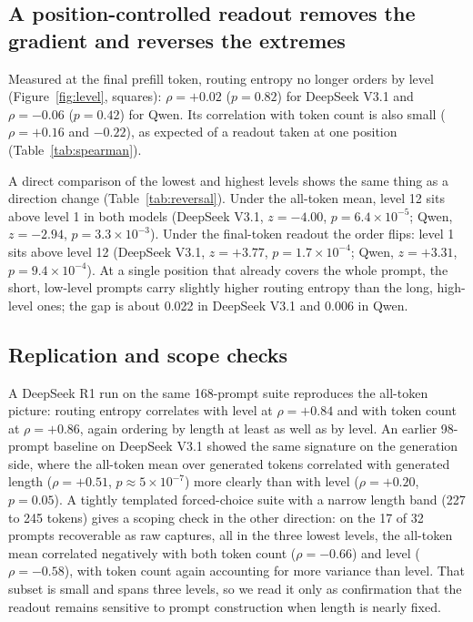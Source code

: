 \documentclass[10pt,twocolumn]{article}
\begin{document}
\subsection{A position-controlled readout removes the gradient and reverses the extremes}

Measured at the final prefill token, routing entropy no longer orders by
level (Figure~\ref{fig:level}, squares): $\rho=+0.02$ ($p=0.82$) for
DeepSeek V3.1 and $\rho=-0.06$ ($p=0.42$) for Qwen. Its correlation with
token count is also small ($\rho=+0.16$ and $-0.22$), as expected of a
readout taken at one position (Table~\ref{tab:spearman}).

A direct comparison of the lowest and highest levels shows the same thing as
a direction change (Table~\ref{tab:reversal}). Under the all-token mean,
level 12 sits above level 1 in both models (DeepSeek V3.1, $z=-4.00$,
$p=6.4\times10^{-5}$; Qwen, $z=-2.94$, $p=3.3\times10^{-3}$). Under the
final-token readout the order flips: level 1 sits above level 12
(DeepSeek V3.1, $z=+3.77$, $p=1.7\times10^{-4}$; Qwen, $z=+3.31$,
$p=9.4\times10^{-4}$). At a single position that already covers the whole
prompt, the short, low-level prompts carry slightly higher routing entropy
than the long, high-level ones; the gap is about 0.022 in DeepSeek V3.1 and
0.006 in Qwen.

\subsection{Replication and scope checks}

A DeepSeek R1 run on the same 168-prompt suite reproduces the all-token
picture: routing entropy correlates with level at $\rho=+0.84$ and with
token count at $\rho=+0.86$, again ordering by length at least as well as by
level. An earlier 98-prompt baseline on DeepSeek V3.1 showed the same
signature on the generation side, where the all-token mean over generated
tokens correlated with generated length ($\rho=+0.51$, $p\approx5\times10^{-7}$)
more clearly than with level ($\rho=+0.20$, $p=0.05$). A tightly templated
forced-choice suite with a narrow length band (227 to 245 tokens) gives a
scoping check in the other direction: on the 17 of 32 prompts recoverable
as raw captures, all in the three lowest levels, the all-token mean
correlated negatively with both token count ($\rho=-0.66$) and level
($\rho=-0.58$), with token count again accounting for more variance than
level. That subset is small and spans three levels, so we read it only as
confirmation that the readout remains sensitive to prompt construction when
length is nearly fixed.
\end{document}
